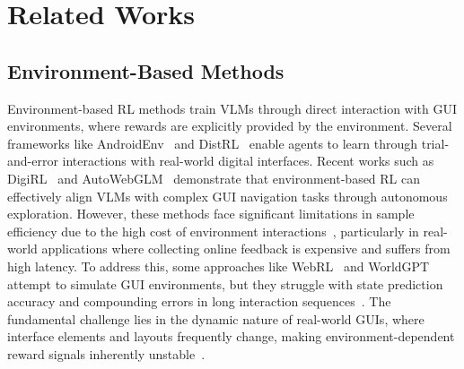\section{Related Works}
\subsection{Environment-Based Methods}
Environment-based RL methods train VLMs through direct interaction with GUI environments, where rewards are explicitly provided by the environment. Several frameworks like AndroidEnv~\cite{toyama2021androidenv} and DistRL~\cite{wang2024distrl} enable agents to learn through trial-and-error interactions with real-world digital interfaces. Recent works such as DigiRL~\cite{bai2024digirl} and AutoWebGLM~\cite{lai2024autowebglm} demonstrate that environment-based RL can effectively align VLMs with complex GUI navigation tasks through autonomous exploration. However, these methods face significant limitations in sample efficiency due to the high cost of environment interactions~\cite{xie2021policy,niu2022trust}, particularly in real-world applications where collecting online feedback is expensive and suffers from high latency. To address this, some approaches like WebRL~\cite{qi2024webrl} and WorldGPT~\cite{ge2024worldgpt} attempt to simulate GUI environments, but they struggle with state prediction accuracy and compounding errors in long interaction sequences~\cite{guan2023leveraging,zhang2024mme}. The fundamental challenge lies in the dynamic nature of real-world GUIs, where interface elements and layouts frequently change, making environment-dependent reward signals inherently unstable~\cite{zhang2024ufo,zhang2024android}.

